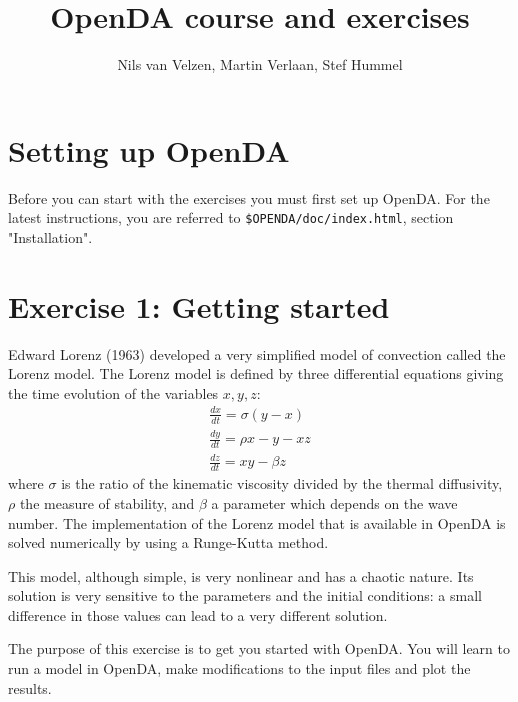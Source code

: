 \documentclass[a4paper,10pt]{article}
\title{OpenDA course and exercises}
\author{Nils van Velzen, Martin Verlaan, Stef Hummel}
\begin{document}
\maketitle



\section*{Setting up OpenDA}
Before you can start with the exercises you must first set up OpenDA. For the
latest instructions, you are referred to {\tt \$OPENDA/doc/index.html}, 
section "Installation".

\section{Exercise 1: Getting started}

Edward Lorenz (1963) developed
a very simplified model of convection called the Lorenz model. The Lorenz model
is defined by three differential equations giving the time evolution of the
variables $x,y,z$:
\begin{eqnarray}
   \frac{dx}{dt}=\sigma(y-x) \\
   \frac{dy}{dt}=\rho x - y -x z \\
   \frac{dz}{dt}=x y - \beta z
\end{eqnarray}
where $\sigma$ is the ratio of the kinematic viscosity divided by the thermal
diffusivity, $\rho$ the measure of stability, and $\beta$ a parameter which
depends on the wave number.
The implementation of the Lorenz model that is available in OpenDA is solved numerically by using a Runge-Kutta method.

This model, although simple, is very nonlinear and has a chaotic nature.  Its
solution is very sensitive to the parameters and the initial conditions: a
small difference in those values can lead to a very different solution.

The purpose of this exercise is to get you started with OpenDA. You will learn
to run a model in OpenDA, make modifications to the input files and plot the
results.
\end{document}
